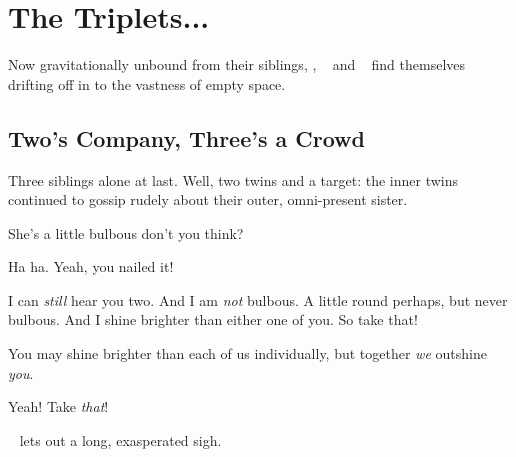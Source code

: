 \documentclass[main.tex]{subfiles}
\begin{document}
\chapter{The Triplets...}


 
\par \nar Now gravitationally unbound from their siblings, \rmtaygete, \rmalcyone~ and \rmcelaeno~ find themselves drifting off in to the vastness of empty space.  

\section{Two's Company, Three's a Crowd}

\par \nar Three siblings alone at last.  Well, two twins and a target: the inner twins continued to gossip rudely about their outer, omni-present sister.

\par \Taygete She's a little bulbous don't you think?

\par \Alcyone  Ha ha.  Yeah, you nailed it!

\par \Celaeno  I can \textit{still} hear you two.  And I am \textit{not} bulbous.  A little round perhaps, but never bulbous.  And I shine brighter than either one of you.  So take that!

\par \Alcyone You may shine brighter than each of us individually, but together \textit{we} outshine \textit{you}.  

\par \Taygete Yeah!  Take \textit{that}!

\par \nar \rmcelaeno~ lets out a long, exasperated sigh.
\end{document}
